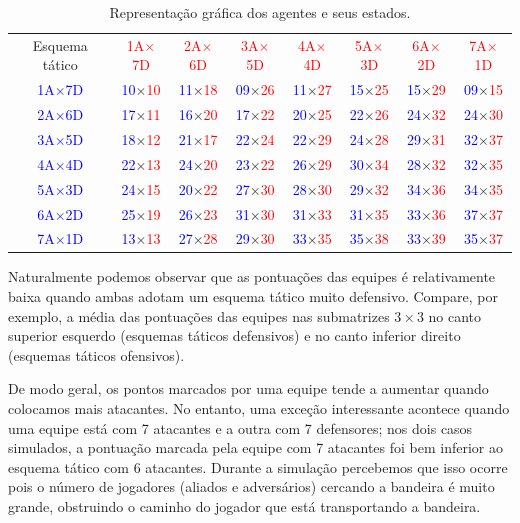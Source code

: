 \documentclass[preprint,12pt]{elsarticle}
\newcommand{\red}[1]{\textcolor{red}{#1}}
\newcommand{\blu}[1]{\textcolor{blue}{#1}}
\newcommand{\score}[2]{\blu{#1}$\times$\red{#2}}
\begin{document}
\begin{table}[H]
	\begin{center}
		\begin{tabular}{cccccccc}
			\toprule
			Esquema tático & \red{1A$\times$7D}  & \red{2A$\times$6D}  & \red{3A$\times$5D}  & \red{4A$\times$4D}  & \red{5A$\times$3D}  & \red{6A$\times$2D}  & \red{7A$\times$1D}\\
			\cmidrule(r){1-8}
			\blu{1A$\times$7D}    & \score{10}{10} & \score{11}{18} & \score{09}{26} & \score{11}{27} & \score{15}{25} & \score{15}{29} & \score{09}{15} \\
			\blu{2A$\times$6D}    & \score{17}{11} & \score{16}{20} & \score{17}{22} & \score{20}{25} & \score{22}{26} & \score{24}{32} & \score{24}{30} \\
			\blu{3A$\times$5D}    & \score{18}{12} & \score{21}{17} & \score{22}{24} & \score{22}{29} & \score{24}{28} & \score{29}{31} & \score{32}{37} \\
			\blu{4A$\times$4D}    & \score{22}{13} & \score{24}{20} & \score{23}{22} & \score{26}{29} & \score{30}{34} & \score{28}{32} & \score{32}{35} \\
			\blu{5A$\times$3D}    & \score{24}{15} & \score{20}{22} & \score{27}{30} & \score{28}{30} & \score{29}{32} & \score{34}{36} & \score{34}{35} \\
			\blu{6A$\times$2D}    & \score{25}{19} & \score{26}{23} & \score{31}{30} & \score{31}{33} & \score{31}{35} & \score{33}{36} & \score{37}{37} \\
			\blu{7A$\times$1D}    & \score{13}{13} & \score{27}{28} & \score{29}{30} & \score{33}{35} & \score{35}{38} & \score{33}{39} & \score{35}{37} \\

			\bottomrule
		\end{tabular}
		\caption{Representação gráfica dos agentes e seus estados.}
		\label{tbl:flag_scoreboard}
	\end{center}
\end{table}

Naturalmente podemos observar que as pontuações das equipes é relativamente baixa quando ambas adotam um esquema tático muito defensivo. Compare, por exemplo, a média das pontuações das equipes nas submatrizes $3\times3$ no canto superior esquerdo (esquemas táticos defensivos) e no canto inferior direito (esquemas táticos ofensivos).

De modo geral, os pontos marcados por uma equipe tende a aumentar quando colocamos mais atacantes. No entanto, uma exceção interessante acontece quando uma equipe está com 7 atacantes e a outra com 7 defensores; nos dois casos simulados, a pontuação marcada pela equipe com 7 atacantes foi bem inferior ao esquema tático com 6 atacantes. Durante a simulação percebemos que isso ocorre pois o número de jogadores (aliados e adversários) cercando a bandeira é muito grande, obstruindo o caminho do jogador que está transportando a bandeira.
\end{document}
